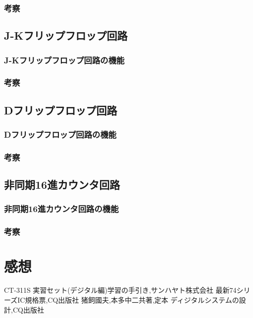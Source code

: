 \documentclass[twocolumn, 10pt,a4j]{jsarticle}
\begin{document}
  \subsubsection{考察}
\subsection{J-Kフリップフロップ回路}
  \subsubsection{J-Kフリップフロップ回路の機能}
  \subsubsection{考察}
\subsection{Dフリップフロップ回路}
  \subsubsection{Dフリップフロップ回路の機能}
  \subsubsection{考察}
\subsection{非同期16進カウンタ回路}
  \subsubsection{非同期16進カウンタ回路の機能}
  \subsubsection{考察}
\section{感想}


\begin{thebibliography}{3}
\bibitem{}CT-311S 実習セット(デジタル編)学習の手引き,サンハヤト株式会社
\bibitem{}最新74シリーズIC規格票,CQ出版社
\bibitem{}猪飼國夫,本多中二共著,定本 ディジタルシステムの設計,CQ出版社
\end{thebibliography}
\end{document}
